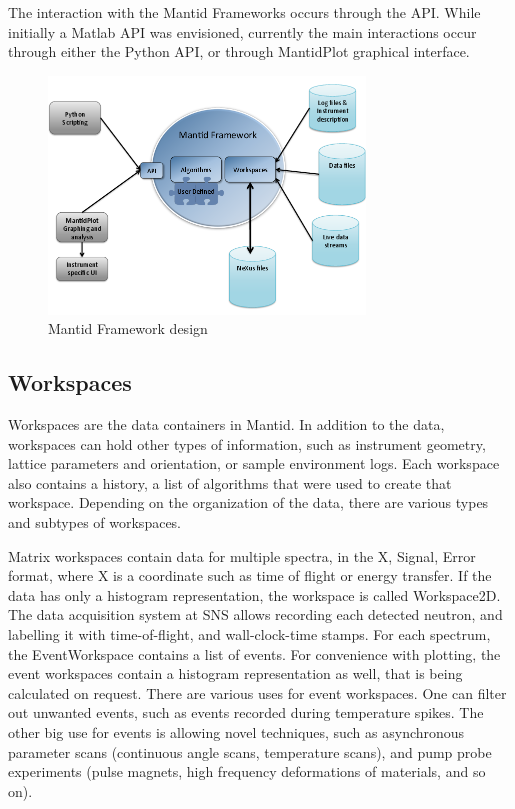 \documentclass{elsarticle}
\begin{document}
The interaction with the Mantid Frameworks occurs through the API. While initially a Matlab API was envisioned, currently the main interactions occur through either the Python API, or through MantidPlot graphical interface. 
\label{components}
\begin{figure}[!ht]
\centerline{\includegraphics[width=0.75\textwidth]{MantidFramework.png}}
\caption{Mantid Framework design}
\label{fig:Framework}
\end{figure}

\subsection{Workspaces}
Workspaces are the data containers in Mantid. In addition to the data, workspaces can hold other types of information, such as instrument geometry, lattice parameters and orientation, or sample environment logs. Each workspace also contains a history, a list of algorithms that were used to create that workspace. Depending on the organization of the data, there are various types and subtypes of workspaces.

Matrix workspaces contain data for multiple spectra, in the X, Signal, Error format, where X is a coordinate such as time of flight or energy transfer. If the data has only a histogram representation, the workspace is called Workspace2D. The data acquisition system at SNS allows recording each  detected neutron, and labelling it with time-of-flight, and wall-clock-time stamps. For each spectrum, the EventWorkspace contains a list of events. For convenience with plotting, the event workspaces contain a histogram representation as well, that is being calculated on request. There are various uses for event workspaces. One can filter out unwanted events, such as events recorded during temperature spikes. The other big use for events is allowing novel techniques, such as asynchronous parameter scans (continuous angle scans, temperature scans), and pump probe experiments (pulse magnets, high frequency deformations of materials, and so on).
\end{document}

